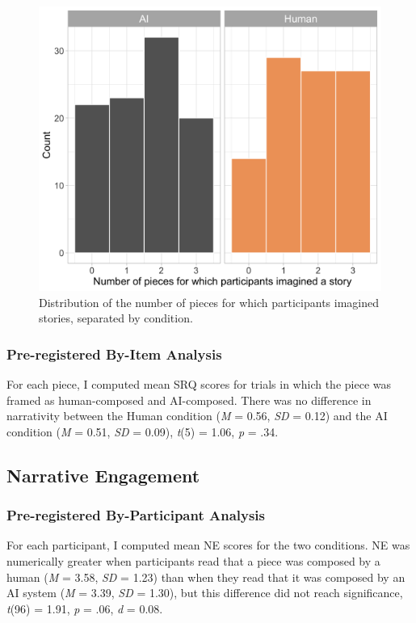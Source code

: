 \documentclass[12pt,twoside]{reedthesis}
\begin{document}
\begin{figure}[h!tbp]
	\centering
	\includegraphics[scale=0.25]{SRQ_dist.png}
	\caption{Distribution of the number of pieces for which participants imagined stories, separated by condition.}
	\label{fig-SRQ-dist}
\end{figure}

\subsubsection*{Pre-registered By-Item Analysis}

For each piece, I computed mean SRQ scores for trials in which the piece was framed as human-composed and AI-composed. There was no difference in narrativity between the Human condition (\emph{M} = 0.56, \emph{SD} = 0.12) and the AI condition (\emph{M} = 0.51, \emph{SD} = 0.09), \emph{t}(5) = 1.06, \emph{p} = .34.

\subsection{Narrative Engagement}
\subsubsection*{Pre-registered By-Participant Analysis}
For each participant, I computed mean NE scores for the two conditions. NE was numerically greater when participants read that a piece was composed by a human (\emph{M} = 3.58, \emph{SD} = 1.23) than when they read that it was composed by an AI system (\emph{M} = 3.39, \emph{SD} = 1.30), but this difference did not reach significance, \emph{t}(96) = 1.91, \emph{p} = .06, \emph{d} = 0.08.
\end{document}

